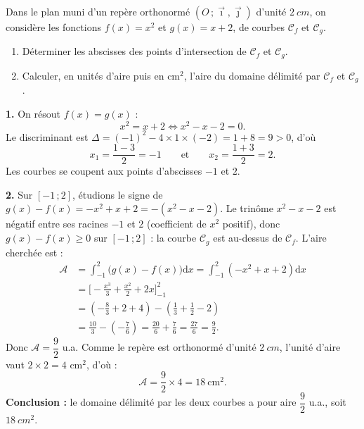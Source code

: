 \documentclass[11pt]{article}
\begin{document}
\begin{exoresolu}
Dans le plan muni d'un repère orthonormé $(O\,;\vec{\imath},\vec{\jmath})$ d'unité $\SI{2}{cm}$, on considère les fonctions $f(x)=x^2$ et $g(x)=x+2$, de courbes $\mathcal{C}_f$ et $\mathcal{C}_g$.
\begin{enumerate}
\item Déterminer les abscisses des points d'intersection de $\mathcal{C}_f$ et $\mathcal{C}_g$.
\item Calculer, en unités d'aire puis en cm$^2$, l'aire du domaine délimité par $\mathcal{C}_f$ et $\mathcal{C}_g$.
\end{enumerate}
\tcblower
\textbf{1.} On résout $f(x)=g(x)$ :
\[ x^2=x+2 \iff x^2-x-2=0. \]
Le discriminant est $\Delta=(-1)^2-4\times 1\times(-2)=1+8=9>0$, d'où
\[ x_1=\frac{1-3}{2}=-1 \qquad\text{et}\qquad x_2=\frac{1+3}{2}=2. \]
Les courbes se coupent aux points d'abscisses $-1$ et $2$.

\textbf{2.} Sur $[-1\,;2]$, étudions le signe de $g(x)-f(x)=-x^2+x+2=-(x^2-x-2)$. Le trinôme $x^2-x-2$ est négatif entre ses racines $-1$ et $2$ (coefficient de $x^2$ positif), donc $g(x)-f(x)\geq 0$ sur $[-1\,;2]$ : la courbe $\mathcal{C}_g$ est au-dessus de $\mathcal{C}_f$. L'aire cherchée est :
\begin{align*}
\mathcal{A} &= \int_{-1}^{2}\big(g(x)-f(x)\big)\mathrm{d}x = \int_{-1}^{2}\left(-x^2+x+2\right)\mathrm{d}x \\
&= \Big[-\frac{x^3}{3}+\frac{x^2}{2}+2x\Big]_{-1}^{2} \\
&= \left(-\frac{8}{3}+2+4\right)-\left(\frac{1}{3}+\frac{1}{2}-2\right) \\
&= \frac{10}{3}-\left(-\frac{7}{6}\right) = \frac{20}{6}+\frac{7}{6} = \frac{27}{6} = \frac{9}{2}.
\end{align*}
Donc $\mathcal{A}=\dfrac{9}{2}$ u.a. Comme le repère est orthonormé d'unité $\SI{2}{cm}$, l'unité d'aire vaut $2\times 2=4$ cm$^2$, d'où :
\[ \mathcal{A}=\frac{9}{2}\times 4 = 18\ \text{cm}^2. \]
\textbf{Conclusion :} le domaine délimité par les deux courbes a pour aire $\dfrac{9}{2}$ u.a., soit $\SI{18}{cm^2}$.
\end{exoresolu}
\end{document}
